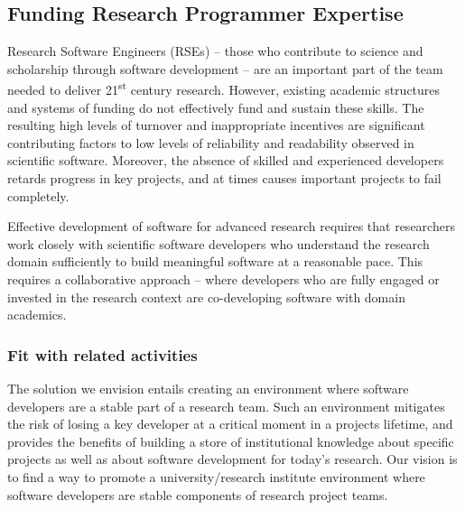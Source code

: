 \subsection{Funding Research Programmer Expertise}
\label{RSE}



Research Software Engineers (RSEs) -- those who contribute to science and
scholarship through software development -- are an important part of the team
needed to deliver 21\textsuperscript{st} century research. However, existing
academic structures
and systems of funding do not effectively fund and sustain these skills. The
resulting high levels of turnover and inappropriate incentives are significant
contributing factors to low levels of reliability and readability observed in
scientific software. Moreover, the absence of skilled and experienced developers
retards progress in key projects, and at times causes important projects to fail
completely.

Effective development of software for advanced research requires that
researchers work closely with scientific software developers who understand the
research domain sufficiently to build meaningful software at a reasonable pace.
This requires a collaborative approach -- where developers who are fully engaged
or invested in the research context are co-developing software with domain
academics.

\subsubsection{Fit with related activities}

The solution we envision entails creating an environment where software
developers are a stable part of a research team. Such an environment mitigates
the risk of losing a key developer at a critical moment in a projects lifetime,
and provides the benefits of building a store of institutional knowledge about
specific projects as well as about software development for today's research.
Our vision is to find a way to promote a university/research institute
environment where software developers are stable components of research project
teams.

